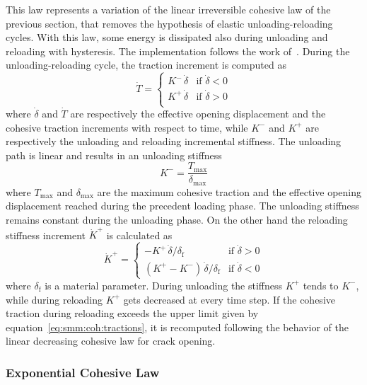 This law represents a variation of the linear irreversible cohesive
law of the previous section, that removes the hypothesis of elastic
unloading-reloading cycles. With this law, some energy is dissipated
also during unloading and reloading with hysteresis. The
implementation follows the work of~\cite{nguyen2001}. During the
unloading-reloading cycle, the traction increment is computed as
\begin{equation}
  \dot{T} =
  \begin{cases}
    K^- \, \dot{\delta} & \text{if $\dot{\delta} < 0$} \\
    K^+ \, \dot{\delta} & \text{if $\dot{\delta} > 0$} \\
  \end{cases}
\end{equation}
where $\dot{\delta}$ and $\dot{T}$ are respectively the effective
opening displacement and the cohesive traction increments with respect
to time, while $K^-$ and $K^+$ are respectively the unloading and
reloading incremental stiffness. The unloading path is linear and
results in an unloading stiffness
\begin{equation}
  K^- = \frac{T_\mathrm{max}}{\delta_\mathrm{max}}
\end{equation}
where $T_\mathrm{max}$ and $\delta_\mathrm{max}$ are the maximum
cohesive traction and the effective opening displacement reached
during the precedent loading phase. The unloading stiffness remains
constant during the unloading phase. On the other hand the reloading
stiffness increment $\dot{K}^+$ is calculated as
\begin{equation}
  \dot{K}^+ =
  \begin{cases}
    - K^+ \, \dot{\delta} / \delta_\mathrm{f} & \text{if $\dot{\delta}
      > 0$} \\
    \left( K^+ - K^- \right) \, \dot{\delta} / \delta_\mathrm{f} &
    \text{if $\dot{\delta} < 0$}
  \end{cases}
\end{equation}
where $\delta_\mathrm{f}$ is a material parameter. During unloading
the stiffness $K^+$ tends to $K^-$, while during reloading $K^+$ gets
decreased at every time step. If the cohesive traction during
reloading exceeds the upper limit given by
equation~\eqref{eq:smm:coh:tractions}, it is recomputed following the
behavior of the linear decreasing cohesive law for crack opening.

\subsubsection{Exponential Cohesive Law}

